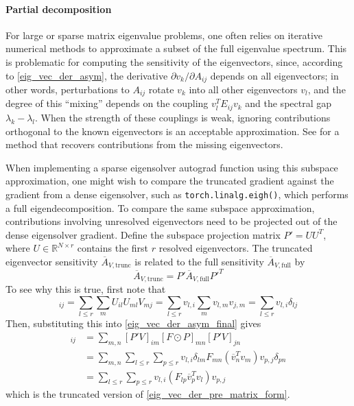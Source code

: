 \documentclass[11pt, a4paper]{article}
\begin{document}
\paragraph{Partial decomposition}
For large or sparse matrix eigenvalue problems, one often relies on iterative numerical methods to approximate a subset of the full eigenvalue spectrum. This is problematic for computing the sensitivity of the eigenvectors, since, according to \eqref{eig_vec_der_asym}, the derivative $\partial v_k/\partial A_{ij}$ depends on all eigenvectors; in other words, perturbations to $A_{ij}$ rotate $v_k$ into all other eigenvectors $v_l$, and the degree of this ``mixing'' depends on the coupling $v_l^TE_{ij}v_k$ and the spectral gap $\lambda_k - \lambda_l$. When the strength of these couplings is weak, ignoring contributions orthogonal to the known eigenvectors is an acceptable approximation. See \cite{kasim2020derivativespartialeigendecompositionreal} for a method that recovers contributions from the missing eigenvectors.

When implementing a sparse eigensolver autograd function using this subspace approximation, one might wish to compare the truncated gradient against the gradient from a dense eigensolver, such as \texttt{torch.linalg.eigh()}, which performs a full eigendecomposition. To compare the same subspace approximation, contributions involving unresolved eigenvectors need to be projected out of the dense eigensolver gradient. Define the subspace projection matrix $P'=UU^T$, where $U\in\mathbb R^{N\times r}$ contains the first $r$ resolved eigenvectors. The truncated eigenvector sensitivity $\overline{A}_{V,\text{trunc}}$ is related to the full sensitivity $\overline{A}_{V,\text{full}}$ by
\begin{equation}
    \overline{A}_{V,\text{trunc}} = P'\overline{A}_{V,\text{full}}P'^T
\end{equation}
To see why this is true, first note that
\begin{equation}
    [P'V]_{ij} = \sum_{l\le r}\sum_m U_{il}U_{ml}V_{mj} = \sum_{l\le r}v_{l,i}\sum_m v_{l,m}v_{j,m} = \sum_{l\le r} v_{l,i}\delta_{lj}
\end{equation}
Then, substituting this into \eqref{eig_vec_der_asym_final} gives
\begin{align}
    [P'\overline{A}_{V,\text{full}}P'^T]_{ij} & = \sum_{m,n}[P'V]_{im}[F\odot P]_{mn}[P'V]_{jn} \\ & = \sum_{m,n}\sum_{l\le r}\sum_{p\le r}v_{l,i}\delta_{lm}F_{mn}(\overline{v}_n^Tv_m)v_{p,j}\delta_{pn} \\ &=\sum_{l\le r}\sum_{p\le r} v_{l,i}(F_{lp}\overline{v}_p^Tv_l)v_{p,j}
\end{align}
which is the truncated version of \eqref{eig_vec_der_pre_matrix_form}.
\end{document}
